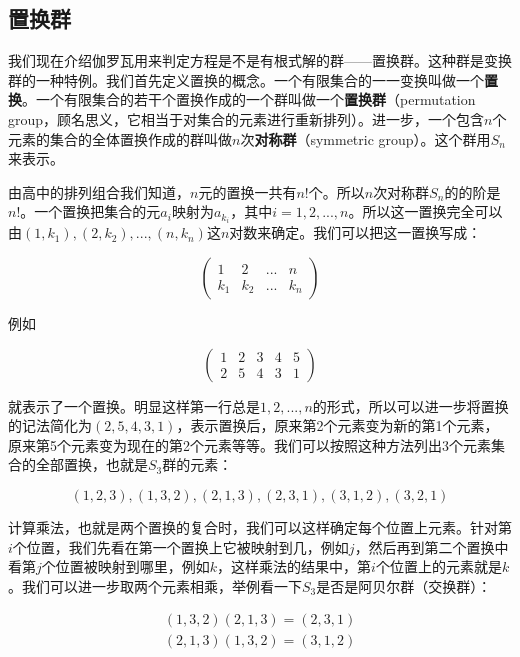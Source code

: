 \documentclass{article}
\begin{document}
\subsection{置换群}
\label{permutation group}
\label{symmetric group}

我们现在介绍伽罗瓦用来判定方程是不是有根式解的群——置换群。这种群是变换群的一种特例。我们首先定义置换的概念。一个有限集合的一一变换叫做一个\textbf{置换}。一个有限集合的若干个置换作成的一个群叫做一个\textbf{置换群}（permutation group，顾名思义，它相当于对集合的元素进行重新排列）。进一步，一个包含$n$个元素的集合的全体置换作成的群叫做$n$次\textbf{对称群}（symmetric group）。这个群用$S_n$来表示。

由高中的排列组合我们知道，$n$元的置换一共有$n!$个。所以$n$次对称群$S_n$的的阶是$n!$。一个置换把集合的元$a_i$映射为$a_{k_i}$，其中$i = 1, 2, ..., n$。所以这一置换完全可以由$(1, k_1), (2, k_2), ..., (n, k_n)$这$n$对数来确定。我们可以把这一置换写成：

\[
\begin{pmatrix}
1 & 2 & ... & n \\
k_1 & k_2 & ... & k_n
\end{pmatrix}
\]

例如

\[
\begin{pmatrix}
1 & 2 & 3 & 4 & 5 \\
2 & 5 & 4 & 3 & 1
\end{pmatrix}
\]

就表示了一个置换。明显这样第一行总是$1, 2, ..., n$的形式，所以可以进一步将置换的记法简化为$(2, 5, 4, 3, 1)$，表示置换后，原来第2个元素变为新的第1个元素，原来第5个元素变为现在的第2个元素等等。我们可以按照这种方法列出3个元素集合的全部置换，也就是$S_3$群的元素：

\[
(1, 2, 3), (1, 3, 2), (2, 1, 3), (2, 3, 1), (3, 1, 2), (3, 2, 1)
\]

计算乘法，也就是两个置换的复合时，我们可以这样确定每个位置上元素。针对第$i$个位置，我们先看在第一个置换上它被映射到几，例如$j$，然后再到第二个置换中看第$j$个位置被映射到哪里，例如$k$，这样乘法的结果中，第$i$个位置上的元素就是$k$。我们可以进一步取两个元素相乘，举例看一下$S_3$是否是阿贝尔群（交换群）：

\[
\begin{array}{l}
(1, 3, 2) (2, 1, 3) = (2, 3, 1) \\
(2, 1, 3) (1, 3, 2) = (3, 1, 2)
\end{array}
\]
\end{document}
